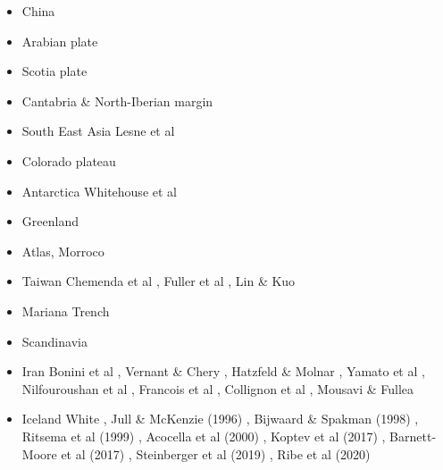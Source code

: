 \begin{itemize}
\item China 
{\scriptsize
\cite{zhst10}
\cite{wazh15}
\cite{guyr16}
\cite{dawl20}
}
\item Arabian plate 
{\scriptsize
\cite{rerl15}
}
\item Scotia plate 
{\scriptsize
\cite{necb13}
\cite{vaga20}
}
\item Cantabria \& North-Iberian margin 
{\scriptsize
\cite{clbb02}
\cite{peap15}
}
\item South East Asia 
{\scriptsize
Lesne et al \cite{lecd00}\\
\cite{rekv04}
\cite{yotr15}\cite{hasp15}\cite{meds15}
\cite{necg16}
}
\item Colorado plateau 
{\scriptsize
\cite{vabv10}
\cite{lesm11}
}
\item Antarctica  
{\scriptsize
\cite{huha07}
Whitehouse et al \cite{whbl12}
}
\item Greenland  
{\scriptsize
\cite{stsj15}\cite{heps15}\cite{stbl19}
}
\item Atlas, Morroco  
{\scriptsize
\cite{mica12}
\cite{kava14}
}
\item Taiwan  
{\scriptsize
Chemenda et al \cite{chys01}, Fuller et al \cite{fuwf06}, Lin \& Kuo \cite{liku16}
}
\item Mariana Trench  
{\scriptsize
\cite{zhlb15}
}
\item Scandinavia  
{\scriptsize
\cite{ramb80}
\cite{bovc14}
}
\item Iran
{\scriptsize
Bonini et al \cite{bocs03},
Vernant \&  Chery \cite{vech06},
Hatzfeld \& Molnar \cite{hamo10},
Yamato et al \cite{yakm11},
Nilfouroushan et al \cite{nipc13},
Francois et al \cite{frba14},
Collignon et al \cite{coyc16},
Mousavi \& Fullea \cite{mofu20}
} 

\item Iceland
{\scriptsize
White \cite{whit89},
Jull \& McKenzie (1996) \cite{jumc96},
Bijwaard \& Spakman  (1998) \cite{bisp98},
Ritsema et al (1999) \cite{rivw99},
Acocella et al  (2000) \cite{acgf00},
Koptev et al (2017) \cite{kocb17},
Barnett-Moore et al (2017) \cite{bahf17},
Steinberger et al (2019) \cite{stbl19},
Ribe et al (2020) \cite{rits20}
} 


\end{itemize}
